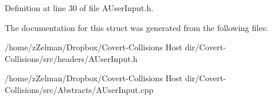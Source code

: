 Definition at line 30 of file A\-User\-Input.\-h.



The documentation for this struct was generated from the following files\-:\begin{DoxyCompactItemize}
\item 
/home/z\-Zelman/\-Dropbox/\-Covert-\/\-Collisions Host dir/\-Covert-\/\-Collisions/src/headers/A\-User\-Input.\-h\item 
/home/z\-Zelman/\-Dropbox/\-Covert-\/\-Collisions Host dir/\-Covert-\/\-Collisions/src/\-Abstracts/A\-User\-Input.\-cpp\end{DoxyCompactItemize}
